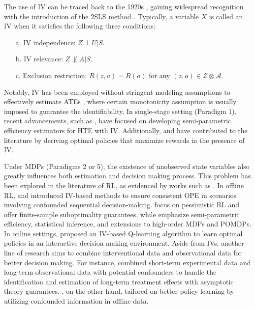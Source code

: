 The use of \acrshort{IV} can be traced back to the 1920s \citep{wright1928tariff}, gaining widespread recognition with the introduction of the \acrfull{2SLS} method \citep{angrist1995two}. Typically, a variable $X$ is called an \acrshort{IV} when it satisfies the following three conditions: 
\begin{enumerate}
    \item[a.] \acrshort{IV} independence: $Z\perp U|S$.
    \item[b.] \acrshort{IV} relevance: $Z\not\perp A|S$.
    \item[c.] Exclusion restriction: $R(z,a)=R(a)$ for any $(z,a)\in \mathcal{Z}\otimes \mathcal{A}$.
\end{enumerate}

Notably, \acrshort{IV} has been employed without stringent modeling assumptions to effectively estimate \acrshort{ATE}s \citep{angrist1996identification}, where certain monotonicity assumption is usually imposed to guarantee the identifiability. In single-stage setting (Paradigm 1), recent advancements, such as \citet{wang2018bounded}, have focused on developing semi-parametric efficiency estimators for \acrshort{HTE} with \acrshort{IV}. Additionally, \citet{qiu2021optimal} and \citet{cui2021semiparametric} have contributed to the literature by deriving optimal policies that maximize rewards in the presence of \acrshort{IV}. 



Under \acrshort{MDP}s (Paradigms 2 or 5), the existence of unobserved state variables also greatly influences both estimation and decision making process. This problem has been explored in the literature of \acrshort{RL}, as evidenced by works such as \citet{li2021causal, fu2022offline, xu2023instrumental,gasse2021causal,imbens2022long}. In offline \acrshort{RL}, \citet{fu2022offline} and \citet{xu2023instrumental} introduced \acrshort{IV}-based methods to ensure consistent \acrshort{OPE} in scenarios involving confounded sequential decision-making. \citet{fu2022offline} focus on pessimistic \acrshort{RL} and offer finite-sample suboptimality guarantees, while \citet{xu2023instrumental} emphasize semi-parametric efficiency, statistical inference, and extensions to high-order \acrshort{MDP}s and \acrshort{POMDP}s.
In online settings, \citet{li2021causal} proposed an \acrshort{IV}-based Q-learning algorithm to learn optimal policies in an interactive decision making environment.
Aside from \acrshort{IV}s, another line of research aims to combine interventional data and observational data for better decision making. For instance, \citet{imbens2022long} combined short-term experimental data and long-term observational data with potential confounders to handle the identification and estimation of long-term treatment effects with asymptotic theory guarantees. \citet{gasse2021causal}, on the other hand, tailored on better policy learning by utilizing confounded information in offline data. 

